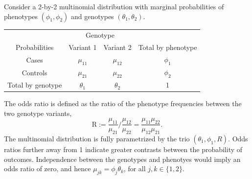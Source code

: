 Consider a 2-by-2 multinomial distribution with marginal probabilities of phenotypes $(\phi_1, \phi_2)$ and genotypes $(\theta_1, \theta_2)$.
\begin{center}
    \begin{tabular}{cccc}
    \hline
    & \multicolumn{2}{c}{Genotype} \\
    \cline{2-3}
    Probabilities & Variant 1 & Variant 2 & Total by phenotype \\
    \hline
    Cases & $\mu_{11}$ & $\mu_{12}$ & $\phi_1$ \\
    Controls & $\mu_{21}$ & $\mu_{22}$ & $\phi_2$ \\
    Total by genotype & $\theta_1$ & $\theta_2$ & 1 \\
    \hline
    \end{tabular}
\end{center}
The odds ratio is defined as the ratio of the phenotype frequencies between the two genotype variants,
\begin{equation} \label{eq:odds-ratio}
    \text{R} := \frac{\mu_{11}}{\mu_{21}}\Big/\frac{\mu_{12}}{\mu_{22}}
    = \frac{\mu_{11}\mu_{22}}{\mu_{12}\mu_{21}}.
\end{equation}
The multinomial distribution is fully parametrized by the trio $(\theta_1, \phi_1, R)$.
Odds ratios further away from 1 indicate greater contrasts between the probability of outcomes.
Independence between the genotypes and phenotyes would imply an odds ratio of zero, and hence $\mu_{jk} = \phi_j\theta_k$, for all $j,k \in\{1,2\}$.

